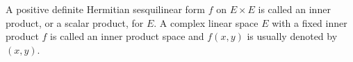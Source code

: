A positive definite Hermitian sesquilinear form $f$ on $E \times E$ is called an inner product, or a scalar product, for $E$. A complex linear space $E$ with a fixed inner product $f$ is called an inner product space and $f(x,y)$ is usually denoted by $(x,y)$.
